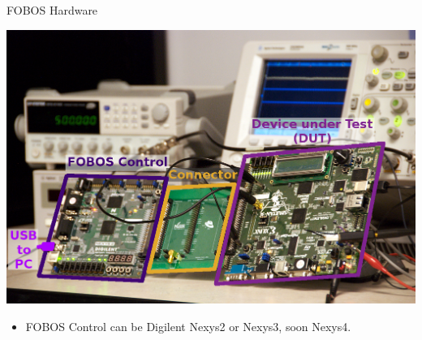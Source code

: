 \documentclass[xcolor=pdftex,dvipsnames,table,final]{beamer}
\begin{document}
\begin{frame}[fragile]{}
\begin{columns}[t]
\begin{column}{.31\linewidth}
      \begin{block}{FOBOS Hardware}
        \vspace{-1ex}
        \begin{center}
          \includegraphics[width=0.9\linewidth]{../figures/FOBOS-label}
        \end{center} 
        \begin{itemize}
          \item FOBOS Control can be Digilent Nexys2 or Nexys3, soon Nexys4.
        \end{itemize}
        \vspace{-0.2ex}
       \end{block}
     

\end{column}
\end{columns}
\end{frame}
\end{document}
